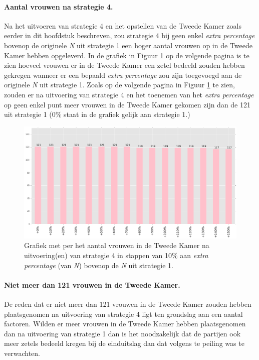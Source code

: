 \paragraph{Aantal vrouwen na strategie 4.}
Na het uitvoeren van strategie 4 en het opstellen van de Tweede Kamer zoals eerder in dit hoofdstuk beschreven, zou strategie 4 bij geen enkel \textit{extra percentage} bovenop de originele \textit{N} uit strategie 1 een hoger aantal vrouwen op in de Tweede Kamer hebben opgeleverd. In de grafiek in Figuur \ref{fig:bcS4V} op de volgende pagina is te zien hoeveel vrouwen er in de Tweede Kamer een zetel bedeeld zouden hebben gekregen wanneer er een bepaald \textit{extra percentage} zou zijn toegevoegd aan de originele \textit{N} uit strategie 1. Zoals op de volgende pagina in Figuur \ref{fig:bcS4V} te zien, zouden er na uitvoering van strategie 4 en het toenemen van het \textit{extra percentage} op geen enkel punt meer vrouwen in de Tweede Kamer gekomen zijn dan de 121 uit strategie 1 (0\% staat in de grafiek gelijk aan strategie 1.) 


\begin{figure}[h]

	\includegraphics[width=\linewidth]	{topNextrapercentage_aantal_vrouwen_overzicht.png}

			\caption{Grafiek met per het aantal vrouwen in de Tweede Kamer na uitvoering(en) van strategie 4 in stappen van 10\% aan \textit{extra percentage} (van \textit{N}) bovenop de \textit{N} uit strategie 1.}

\label{fig:bcS4V}
\end{figure}

\paragraph{Niet meer dan 121 vrouwen in de Tweede Kamer.}
De reden dat er niet meer dan 121 vrouwen in de Tweede Kamer zouden hebben plaatsgenomen na uitvoering van strategie 4 ligt ten grondslag aan een aantal factoren. Wilden er meer vrouwen in de Tweede Kamer hebben plaatsgenomen dan na uitvoering van strategie 1 dan is het noodzakelijk dat de partijen ook meer zetels bedeeld kregen bij de einduitslag dan dat volgens te peiling was te verwachten. 

